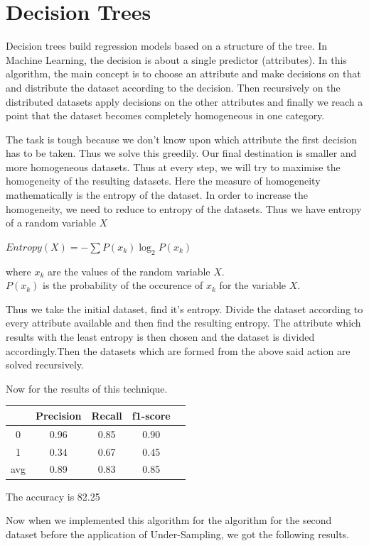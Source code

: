 \section{ Decision Trees}
\par Decision trees build regression models based on a structure of the tree. In Machine Learning, the decision is about a single predictor (attributes). In this algorithm, the main concept is to choose an attribute and make decisions on that and distribute the dataset according to the decision. Then recursively on the distributed datasets apply decisions on the other attributes and finally we reach a point that the dataset becomes completely homogeneous in one category.
\par The task is tough because we don't know upon which attribute the first decision has to be taken. Thus we solve this greedily. Our final destination is smaller and more homogeneous datasets. Thus at every step, we will try to maximise the homogeneity of the resulting datasets. Here the measure of homogeneity mathematically is the entropy of the dataset. In order to increase the homogeneity, we need to reduce to entropy of the datasets. Thus we have entropy of a random variable $X$ ~\cite{decisiontree}
\begin{center}
    $Entropy(X) = -\sum  P(x_{k})\log_2 P(x_{k}) $  ~\cite{decisiontree}
\end{center}
where $x_k$ are the values of the random variable $X$.\\
$P(x_k)$ is the probability of the occurence of $x_{k}$ for the variable $X$.
\par Thus we take the initial dataset, find it's entropy. Divide the dataset according to every attribute available and then find the resulting entropy. The attribute which results with the least entropy is then chosen and the dataset is divided accordingly.Then the datasets which are formed from the above said action are solved recursively.

Now for the results of this technique.

\begin{center}
\begin{tabular}{| c | c | c | c | c |}
\hline
    & Precision & Recall & f1-score \\
\hline
0 & 0.96 & 0.85 & 0.90 \\
\hline
1 & 0.34 & 0.67 & 0.45 \\
\hline
avg & 0.89 & 0.83 & 0.85 \\
\hline
\end{tabular}
\end{center}
\begin{center}
The accuracy is 82.25%
\end{center}
Now when we implemented this algorithm for the algorithm for the second dataset before the application of Under-Sampling, we got the following results.


